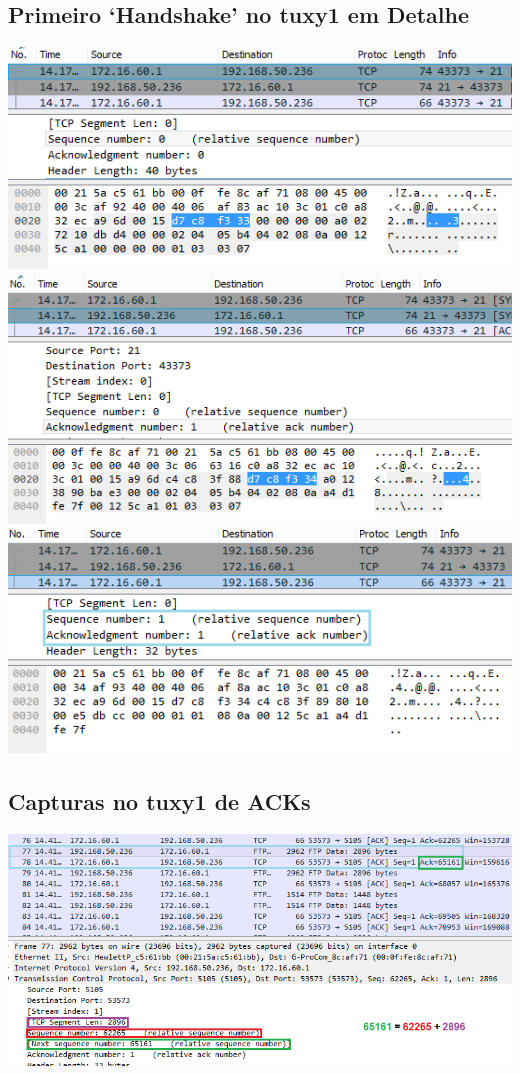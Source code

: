 \documentclass[11pt,a4paper,reqno]{report}
\numberwithin{equation}{section}
\begin{document}
\begin{appendices}
\subsection{Primeiro `Handshake' no tuxy1 em Detalhe}
\label{ex6_tux1_1sthandshake}
\includegraphics[width=18cm]{ex6_handshake1.png}
\includegraphics[width=18cm]{ex6_handshake2.png}
\includegraphics[width=18cm]{ex6_handshake3.png}

\subsection{Capturas no tuxy1 de ACKs}
\label{ex6_acks}
\includegraphics[width=18cm]{ex6_arq.png}


\end{appendices}
\end{document}
